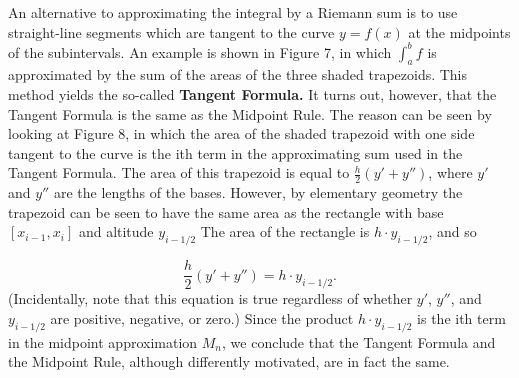 An alternative to approximating the integral by a Riemann sum is to use straight-line segments which are tangent to the curve $y = f(x)$ at the midpoints of the subintervals. An example is shown in Figure 7, in which  
$\int_a^b f$ is approximated by the sum of the areas of the three shaded trapezoids. This method yields the so-called \textbf{Tangent Formula.}  It turns out, however, that the Tangent Formula is the same as the Midpoint Rule. The reason can be seen by looking at Figure 8, in which the area of the shaded trapezoid with one side tangent to the curve is the ith term in the approximating sum used in the Tangent Formula. The area of this trapezoid is equal to $\frac{h}{2} (y' + y'')$, where $y'$ and $y''$ are the lengths of the bases. However, by elementary geometry the trapezoid can be seen to have the same area as the rectangle with base $[x_{i-1}, x_i]$ and altitude $y_{i-1/2}$ The area of the rectangle is $h \cdot y_{i-1/2}$, and so

$$
\frac{h}{2} (y' + y'') = h \cdot y_{i-1/2}.
$$
\noindent (Incidentally, note that this equation is true regardless of whether $y'$, $y''$, and $y_{i-1/2}$ are positive, negative, or zero.) Since the product $h \cdot y_{i-1/2}$ is the ith term in the midpoint approximation $M_n$, we conclude that the Tangent Formula and the Midpoint Rule, although differently motivated, are in fact the same.

